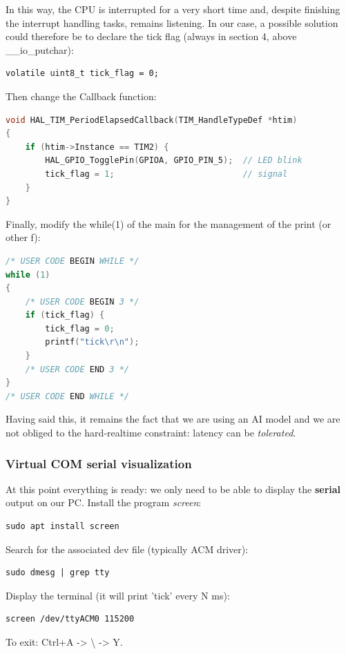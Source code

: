 In this way, the CPU is interrupted for a very short time and, despite finishing the interrupt handling tasks, remains listening.
In our case, a possible solution could therefore be to declare the tick flag (always in section 4, above \_\_io\_putchar):

\begin{verbatim}
volatile uint8_t tick_flag = 0;
\end{verbatim}

Then change the Callback function:

\begin{lstlisting}[language=C]
void HAL_TIM_PeriodElapsedCallback(TIM_HandleTypeDef *htim)
{
    if (htim->Instance == TIM2) {
        HAL_GPIO_TogglePin(GPIOA, GPIO_PIN_5);  // LED blink
        tick_flag = 1;                          // signal
    }
}
\end{lstlisting}

Finally, modify the while(1) of the main for the management of the print (or other f):

\begin{lstlisting}[language=C]
/* USER CODE BEGIN WHILE */
while (1)
{
    /* USER CODE BEGIN 3 */
    if (tick_flag) {
        tick_flag = 0;
        printf("tick\r\n");
    }
    /* USER CODE END 3 */
}
/* USER CODE END WHILE */
\end{lstlisting}

Having said this, it remains the fact that we are using an AI model and we are not obliged to the hard-realtime constraint: latency can be \textit{tolerated}.

\subsubsection{Virtual COM serial visualization}
At this point everything is ready: we only need to be able to display the \textbf{serial} output on our PC. Install the program \textit{screen}:
\begin{verbatim}
sudo apt install screen
\end{verbatim}
Search for the associated dev file (typically ACM driver):
\begin{verbatim}
sudo dmesg | grep tty
\end{verbatim}
Display the terminal (it will print 'tick' every N ms):
\begin{verbatim}
screen /dev/ttyACM0 115200
\end{verbatim}

To exit: Ctrl+A -> \textbackslash{} -> Y. 

